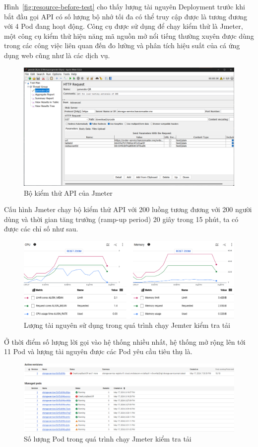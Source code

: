 Hình~\ref{fig:resource-before-test} cho thấy lượng tài nguyên Deployment trước khi bắt đầu gọi API có số lượng bộ nhớ tối đa có thể truy cập được là  tương đương với 4 Pod đang hoạt động.
Công cụ được sử dụng để chạy kiểm thử là Jmeter, một công cụ kiểm thử hiệu năng mã nguồn mở nổi tiếng thường xuyên được dùng trong các công việc liên quan đến đo lường và phân tích hiệu suất của cá ứng dụng web cũng như là các dịch vụ.
\begin{figure}
    \centering
    \includegraphics[width=1\linewidth]{images/hChip/test/Jmeter-setup.png}
    \caption{Bộ kiểm thử API của Jmeter}
    \label{fig:Jmeter-API}
\end{figure}
Cấu hình Jmeter chạy bộ kiểm thử API với 200 luồng tương đương với 200 người dùng và thời gian tăng trưởng (ramp-up period) 20 giây trong 15 phút, ta có được các chỉ số như sau.
\begin{figure}
    \centering
    \includegraphics[width=1\linewidth]{images/hChip/test/resource-after-15m.png}
    \caption{Lượng tài nguyên sử dụng trong quá trình chạy Jemter kiểm tra tải}
    \label{fig:resource-after-15}
\end{figure}
Ở thời điểm số lượng lời gọi vào hệ thống nhiều nhất, hệ thống mở rộng lên tới 11 Pod và lượng tài nguyên được các Pod yêu cầu tiêu thụ là.
\begin{figure}
    \centering
    \includegraphics[width=1\linewidth]{images/hChip/test/pod-number-after-15m.png}
    \caption{Số lượng Pod trong quá trình chạy Jmeter kiểm tra tải}
    \label{fig:pod-number-after-15}
\end{figure}
